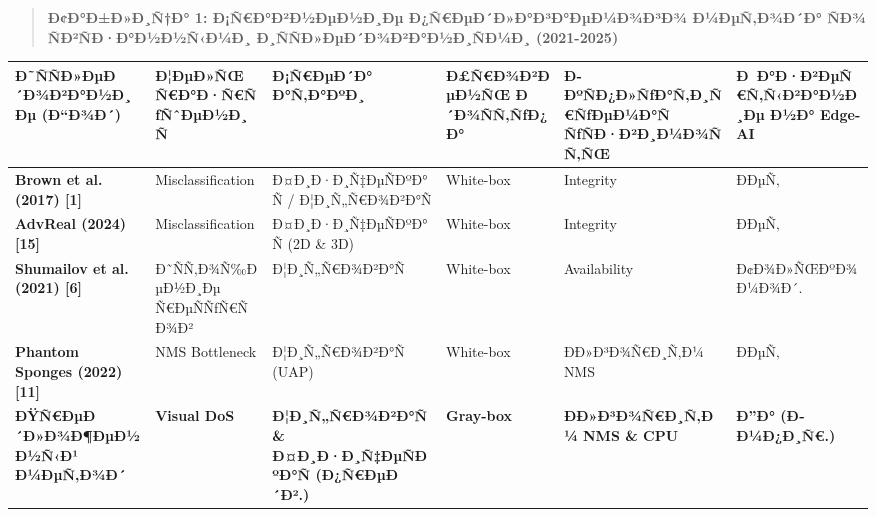 \documentclass[]{article}
\newcounter{none} %
\begin{document}
\begin{quote}
\textbf{Ð¢Ð°Ð±Ð»Ð¸Ñ†Ð° 1: Ð¡Ñ€Ð°Ð²Ð½ÐµÐ½Ð¸Ðµ Ð¿Ñ€ÐµÐ´Ð»Ð°Ð³Ð°ÐµÐ¼Ð¾Ð³Ð¾ Ð¼ÐµÑ‚Ð¾Ð´Ð° ÑÐ¾ ÑÐ²ÑÐ·Ð°Ð½Ð½Ñ‹Ð¼Ð¸ Ð¸ÑÑÐ»ÐµÐ´Ð¾Ð²Ð°Ð½Ð¸ÑÐ¼Ð¸ (2021-2025)}
\end{quote}

{\def\LTcaptype{none} %
\begin{longtable}[]{@{}
  >{\centering\arraybackslash}p{}
  >{\centering\arraybackslash}p{}
  >{\centering\arraybackslash}p{}
  >{\centering\arraybackslash}p{}
  >{\centering\arraybackslash}p{}
  >{\centering\arraybackslash}p{}@{}}
\toprule\noalign{}
\begin{minipage}[b]{\linewidth}\centering
\textbf{Ð˜ÑÑÐ»ÐµÐ´Ð¾Ð²Ð°Ð½Ð¸Ðµ (Ð“Ð¾Ð´)}
\end{minipage} & \begin{minipage}[b]{\linewidth}\centering
\textbf{Ð¦ÐµÐ»ÑŒ Ñ€Ð°Ð·Ñ€ÑƒÑˆÐµÐ½Ð¸Ñ}
\end{minipage} & \begin{minipage}[b]{\linewidth}\centering
\textbf{Ð¡Ñ€ÐµÐ´Ð° Ð°Ñ‚Ð°ÐºÐ¸}
\end{minipage} & \begin{minipage}[b]{\linewidth}\centering
\textbf{Ð£Ñ€Ð¾Ð²ÐµÐ½ÑŒ Ð´Ð¾ÑÑ‚ÑƒÐ¿Ð°}
\end{minipage} & \begin{minipage}[b]{\linewidth}\centering
\textbf{Ð­ÐºÑÐ¿Ð»ÑƒÐ°Ñ‚Ð¸Ñ€ÑƒÐµÐ¼Ð°Ñ ÑƒÑÐ·Ð²Ð¸Ð¼Ð¾ÑÑ‚ÑŒ}
\end{minipage} & \begin{minipage}[b]{\linewidth}\centering
\textbf{Ð Ð°Ð·Ð²ÐµÑ€Ñ‚Ñ‹Ð²Ð°Ð½Ð¸Ðµ Ð½Ð° Edge-AI}
\end{minipage} \\
\midrule\noalign{}
\endhead
\bottomrule\noalign{}
\endlastfoot
\textbf{Brown et al. (2017) {[}1{]}} & Misclassification & Ð¤Ð¸Ð·Ð¸Ñ‡ÐµÑÐºÐ°Ñ / Ð¦Ð¸Ñ„Ñ€Ð¾Ð²Ð°Ñ & White-box & Integrity & ÐÐµÑ‚ \\
\textbf{AdvReal (2024) {[}15{]}} & Misclassification & Ð¤Ð¸Ð·Ð¸Ñ‡ÐµÑÐºÐ°Ñ (2D \& 3D) & White-box & Integrity & ÐÐµÑ‚ \\
\textbf{Shumailov et al. (2021) {[}6{]}} & Ð˜ÑÑ‚Ð¾Ñ‰ÐµÐ½Ð¸Ðµ Ñ€ÐµÑÑƒÑ€ÑÐ¾Ð² & Ð¦Ð¸Ñ„Ñ€Ð¾Ð²Ð°Ñ & White-box & Availability & Ð¢Ð¾Ð»ÑŒÐºÐ¾ Ð¼Ð¾Ð´. \\
\textbf{Phantom Sponges (2022) {[}11{]}} & NMS Bottleneck & Ð¦Ð¸Ñ„Ñ€Ð¾Ð²Ð°Ñ (UAP) & White-box & ÐÐ»Ð³Ð¾Ñ€Ð¸Ñ‚Ð¼ NMS & ÐÐµÑ‚ \\
\textbf{ÐŸÑ€ÐµÐ´Ð»Ð¾Ð¶ÐµÐ½Ð½Ñ‹Ð¹ Ð¼ÐµÑ‚Ð¾Ð´} & \textbf{Visual DoS} &
\textbf{Ð¦Ð¸Ñ„Ñ€Ð¾Ð²Ð°Ñ \& Ð¤Ð¸Ð·Ð¸Ñ‡ÐµÑÐºÐ°Ñ (Ð¿Ñ€ÐµÐ´Ð².)} & \textbf{Gray-box} &
\textbf{ÐÐ»Ð³Ð¾Ñ€Ð¸Ñ‚Ð¼ NMS \& CPU} & \textbf{Ð”Ð° (Ð­Ð¼Ð¿Ð¸Ñ€.)} \\
\end{longtable}
}
\end{document}
